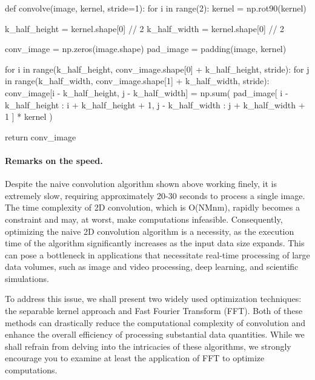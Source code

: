 \documentclass[%
oneside,                 %
final,                   %
10pt]{article}
\begin{document}
\bpycod
def convolve(image, kernel, stride=1):
    for i in range(2):
        kernel = np.rot90(kernel)

    k_half_height = kernel.shape[0] // 2
    k_half_width = kernel.shape[0] // 2

    conv_image = np.zeros(image.shape)
    pad_image = padding(image, kernel)

    for i in range(k_half_height, conv_image.shape[0] + k_half_height, stride):
        for j in range(k_half_width, conv_image.shape[1] + k_half_width, stride):
            conv_image[i - k_half_height, j - k_half_width] = np.sum(
                pad_image[
                    i - k_half_height : i + k_half_height + 1, j - k_half_width : j + k_half_width + 1
                ]
                * kernel
            )

    return conv_image

\epycod


\paragraph{Remarks on the speed.}
Despite the naive convolution algorithm shown above working finely, it
is extremely slow, requiring approximately 20-30 seconds to process a
single image. The time complexity of 2D convolution, which is O(NMnm),
rapidly becomes a constraint and may, at worst, make computations
infeasible. Consequently, optimizing the naive 2D convolution
algorithm is a necessity, as the execution time of the algorithm
significantly increases as the input data size expands. This can pose
a bottleneck in applications that necessitate real-time processing of
large data volumes, such as image and video processing, deep learning,
and scientific simulations.

To address this issue, we shall present two widely used optimization
techniques: the separable kernel approach and Fast Fourier Transform
(FFT). Both of these methods can drastically reduce the computational
complexity of convolution and enhance the overall efficiency of
processing substantial data quantities. While we shall refrain from
delving into the intricacies of these algorithms, we strongly
encourage you to examine at least the application of FFT to optimize
computations.
\end{document}
